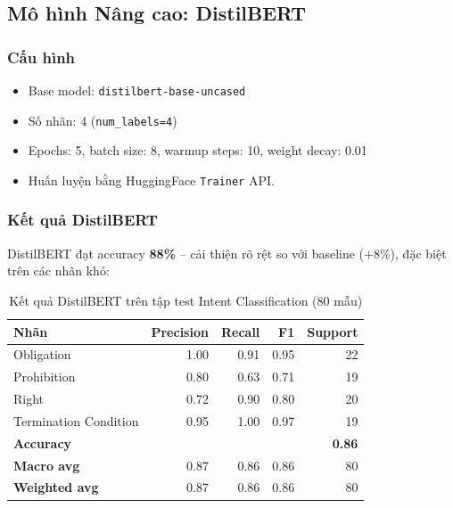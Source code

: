 \subsection{Mô hình Nâng cao: DistilBERT}

\subsubsection{Cấu hình}

\begin{itemize}
    \item Base model: \texttt{distilbert-base-uncased}
    \item Số nhãn: 4 (\texttt{num\_labels=4})
    \item Epochs: 5, batch size: 8, warmup steps: 10, weight decay: 0.01
    \item Huấn luyện bằng HuggingFace \texttt{Trainer} API.
\end{itemize}

\subsubsection{Kết quả DistilBERT}

DistilBERT đạt accuracy \textbf{88\%} -- cải thiện rõ rệt so với baseline (+8\%), đặc biệt trên các nhãn khó:

\begin{table}[H]
    \centering
    \caption{Kết quả DistilBERT trên tập test Intent Classification (80 mẫu)}
    \label{tab:distilbert_results}
    \begin{tabular}{|l|r|r|r|r|}
        \hline
        \textbf{Nhãn} & \textbf{Precision} & \textbf{Recall} & \textbf{F1} & \textbf{Support} \\ \hline
        Obligation            & 1.00 & 0.91 & 0.95 & 22 \\ \hline
        Prohibition           & 0.80 & 0.63 & 0.71 & 19 \\ \hline
        Right                 & 0.72 & 0.90 & 0.80 & 20 \\ \hline
        Termination Condition & 0.95 & 1.00 & 0.97 & 19 \\ \hline
        \textbf{Accuracy}     & \multicolumn{3}{r|}{} & \textbf{0.86} \\ \hline
        \textbf{Macro avg}    & 0.87 & 0.86 & 0.86 & 80 \\ \hline
        \textbf{Weighted avg} & 0.87 & 0.86 & 0.86 & 80 \\ \hline
    \end{tabular}
\end{table}

